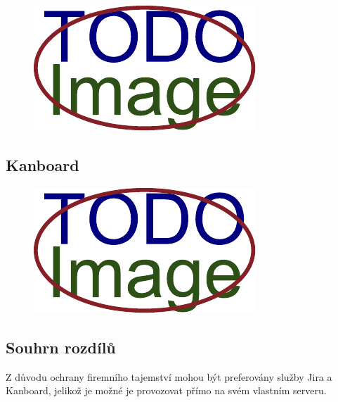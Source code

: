 \blindtext
\begin{figure}[H]
	\centering
	\includegraphics[width=\textwidth]{obrazky-figures/placeholder.pdf}
\end{figure}

\subsection{Kanboard}
\blindtext
\begin{figure}[H]
	\centering
	\includegraphics[width=\textwidth]{obrazky-figures/placeholder.pdf}
\end{figure}

\subsection{Souhrn rozdílů}
Z důvodu ochrany firemního tajemství mohou být preferovány služby Jira a Kanboard, jelikož je možné je provozovat přímo na svém vlastním serveru.
\blindtext


